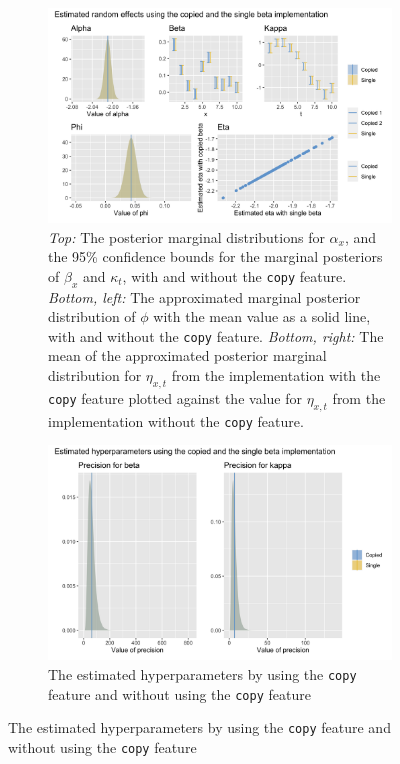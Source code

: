 \begin{figure}[h!]
    \centering
    \begin{subfigure}[b]{0.85\textwidth}
        \includegraphics[width=\textwidth]{synthetic-data/Figures/copy-beta.png}
        \caption{\textit{Top:} The posterior marginal distributions for $\alpha_x$, and the 95\% confidence bounds for the marginal posteriors of $\beta_x$ and $\kappa_t$, with and without the \texttt{copy} feature. \textit{Bottom, left:} The approximated marginal posterior distribution of $\phi$ with the mean value as a solid line, with and without the \texttt{copy} feature. \textit{Bottom, right:} The mean of the approximated posterior marginal distribution for $\eta_{x,t}$ from the implementation with the \texttt{copy} feature plotted against the value for $\eta_{x,t}$ from the implementation without the \texttt{copy} feature. }
        \label{fig:copyBetaComparison-top}
    \end{subfigure}
    
    \begin{subfigure}[b]{0.6\textwidth}
        \includegraphics[width=\textwidth]{synthetic-data/Figures/hyperparameters-LC-copy.png}
        \caption{The estimated hyperparameters by using the \texttt{copy} feature and without using the \texttt{copy} feature}
        \label{fig:copyBetaComparison-bottom}
    \end{subfigure}
    
    \label{fig:copyBetaComparison}
\end{figure}

